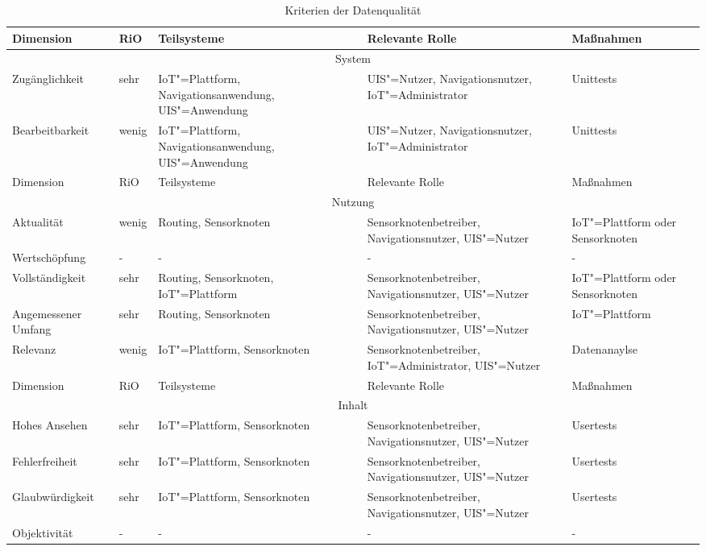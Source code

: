 \begin{landscape}
 \begin{longtable}{|p{4.5cm}|p{1.5cm}|p{4.5cm}|p{4.5cm}|p{3.5cm}|}
	\caption{Kriterien der Datenqualität}\\%
   \hline
   Dimension & RiO & Teilsysteme & Relevante Rolle & Maßnahmen\\ \hline   
   \multicolumn{5}{|c|}{System}  \\ \hline
   Zugänglichkeit & sehr & IoT"=Plattform, Navigationsanwendung, UIS"=Anwendung & UIS"=Nutzer, Navigationsnutzer, IoT"=Administrator & Unittests \\ \hline 
   Bearbeitbarkeit & wenig & IoT"=Plattform, Navigationsanwendung, UIS"=Anwendung & UIS"=Nutzer, Navigationsnutzer, IoT"=Administrator & Unittests \\ \hline
   Dimension & RiO & Teilsysteme & Relevante Rolle & Maßnahmen\\ \hline   
   \multicolumn{5}{|c|}{Nutzung}  \\ \hline
   Aktualität & wenig & Routing, Sensorknoten & Sensorknotenbetreiber, Navigationsnutzer, UIS"=Nutzer & IoT"=Plattform oder Sensorknoten \\ \hline 
   Wertschöpfung & - & - & - & - \\ \hline 
   Vollständigkeit & sehr & Routing, Sensorknoten, IoT"=Plattform & Sensorknotenbetreiber, Navigationsnutzer, UIS"=Nutzer & IoT"=Plattform oder Sensorknoten \\ \hline
   Angemessener Umfang & sehr & Routing, Sensorknoten & Sensorknotenbetreiber, Navigationsnutzer, UIS"=Nutzer & IoT"=Plattform \\ \hline
   Relevanz & wenig & IoT"=Plattform, Sensorknoten & Sensorknotenbetreiber, IoT"=Administrator, UIS"=Nutzer & Datenanaylse \\ \hline
   Dimension & RiO & Teilsysteme & Relevante Rolle & Maßnahmen\\ \hline   
   \multicolumn{5}{|c|}{Inhalt}  \\ \hline
   Hohes Ansehen & sehr & IoT"=Plattform, Sensorknoten & Sensorknotenbetreiber, Navigationsnutzer, UIS"=Nutzer & Usertests \\ \hline 
   Fehlerfreiheit & sehr & IoT"=Plattform, Sensorknoten & Sensorknotenbetreiber, Navigationsnutzer, UIS"=Nutzer & Usertests \\ \hline
   Glaubwürdigkeit & sehr & IoT"=Plattform, Sensorknoten & Sensorknotenbetreiber, Navigationsnutzer, UIS"=Nutzer & Usertests \\ \hline
   Objektivität & - & - & - & - \\ \hline 

\end{longtable}
\end{landscape}
